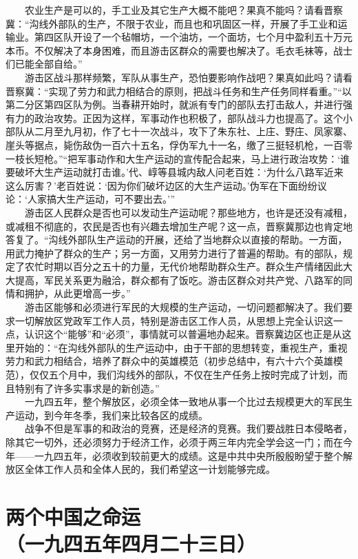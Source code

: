\documentclass[cn,11pt,chinese]{elegantbook}
\def\myformat#1{\hfil\hfil #1}
\begin{document}
　　农业生产是可以的，手工业及其它生产大概不能吧？果真不能吗？请看晋察冀：“沟线外部队的生产，不限于农业，而且也和巩固区一样，开展了手工业和运输业。第四区队开设了一个毡帽坊，一个油坊，一个面坊，七个月中盈利五十万元本币。不仅解决了本身困难，而且游击区群众的需要也解决了。毛衣毛袜等，战士们已能全部自给。”\\
　　游击区战斗那样频繁，军队从事生产，恐怕要影响作战吧？果真如此吗？请看晋察冀：“实现了劳力和武力相结合的原则，把战斗任务和生产任务同样看重。”“以第二分区第四区队为例。当春耕开始时，就派有专门的部队去打击敌人，并进行强有力的政治攻势。正因为这样，军事动作也积极了，部队战斗力也提高了。这个小部队从二月至九月初，作了七十一次战斗，攻下了朱东社、上庄、野庄、凤家寨、崖头等据点，毙伤敌伪一百六十五名，俘伪军九十一名，缴了三挺轻机枪，一百零一枝长短枪。”“把军事动作和大生产运动的宣传配合起来，马上进行政治攻势：‘谁要破坏大生产运动就打击谁。’代、崞等县城内敌人问老百姓：‘为什么八路军近来这么厉害？’老百姓说：‘因为你们破坏边区的大生产运动。’伪军在下面纷纷议论：‘人家搞大生产运动，可不要出去。’”\\
　　游击区人民群众是否也可以发动生产运动呢？那些地方，也许是还没有减租，或减租不彻底的，农民是否也有兴趣去增加生产呢？这一点，晋察冀那边也肯定地答复了。“沟线外部队生产运动的开展，还给了当地群众以直接的帮助。一方面，用武力掩护了群众的生产；另一方面，又用劳力进行了普遍的帮助。有的部队，规定了农忙时期以百分之五十的力量，无代价地帮助群众生产。群众生产情绪因此大大提高，军民关系更为融洽，群众都有了饭吃。游击区群众对共产党、八路军的同情和拥护，从此更增高一步。”\\
　　游击区能够和必须进行军民的大规模的生产运动，一切问题都解决了。我们要求一切解放区党政军工作人员，特别是游击区工作人员，从思想上完全认识这一点，认识这个“能够”和“必须”，事情就可以普遍地办起来。晋察冀边区也正是从这里开始的：“在沟线外部队的生产运动中，由于干部的思想转变，重视生产，重视劳力和武力相结合，培养了群众中的英雄模范（初步总结中，有六十六个英雄模范），仅仅五个月中，我们沟线外的部队，不仅在生产任务上按时完成了计划，而且特别有了许多实事求是的新创造。”\\
　　一九四五年，整个解放区，必须全体一致地从事一个比过去规模更大的军民生产运动，到今年冬季，我们来比较各区的成绩。\\
　　战争不但是军事的和政治的竞赛，还是经济的竞赛。我们要战胜日本侵略者，除其它一切外，还必须努力于经济工作，必须于两三年内完全学会这一门；而在今年——一九四五年，必须收到较前更大的成绩。这是中共中央所殷殷盼望于整个解放区全体工作人员和全体人民的，我们希望这一计划能够完成。\\
\newpage\section*{\myformat{两个中国之命运}\\\myformat{（一九四五年四月二十三日）}}
\end{document}
